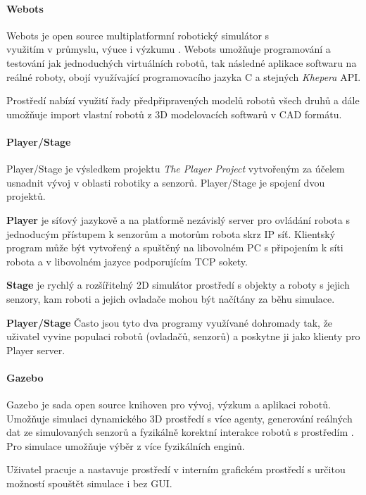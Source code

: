 \documentclass[a4paper, 12pt]{article}
\begin{document}
\paragraph{Webots}
Webots je open source multiplatformní robotický simulátor s \\využitím v
průmyslu, výuce i výzkumu \cite{Webots}. Webots umožňuje programování a
testování jak jednoduchých virtuálních robotů, tak následné aplikace softwaru na 
reálné roboty, obojí využívající programovacího jazyka C a stejných \emph{Khepera}
API\cite{michel1998webots}. 

Prostředí nabízí využití řady předpřipravených modelů robotů všech druhů 
a dále umožňuje import vlastní robotů z 3D modelovacích softwarů v CAD formátu.

\paragraph{Player/Stage}
Player/Stage je výsledkem projektu \emph{The Player Project}
\cite{playerproject} vytvořeným za účelem usnadnit vývoj v oblasti robotiky 
a senzorů. Player/Stage je spojení dvou projektů. 

\textbf{Player} je síťový jazykově a na platformě nezávislý 
server pro ovládání robota s jednoducým přístupem k senzorům a motorům robota
skrz IP síť. Klientský program může být vytvořený a spuštěný na libovolném PC s
připojením k síti robota a v libovolném jazyce podporujícím TCP sokety. 

\textbf{Stage} je rychlý a rozšířitelný 2D simulátor prostředí s objekty a roboty 
s jejich senzory, kam roboti a jejich ovladače mohou být načítány za běhu
simulace.

\textbf{Player/Stage} Často jsou tyto dva programy využívané dohromady tak, že
uživatel vyvine populaci robotů (ovladačů, senzorů) a poskytne ji jako klienty
pro Player server.

\paragraph{Gazebo}
Gazebo je sada open source knihoven pro vývoj, výzkum a aplikaci robotů. 
Umožňuje simulaci dynamického 3D prostředí s více agenty, generování reálných
dat ze simulovaných senzorů a fyzikálně korektní interakce robotů s
prostředím \cite{gazebo1389727}. Pro simulace umožňuje výběr z více fyzikálních
enginů. 

Uživatel pracuje a nastavuje prostředí v interním grafickém prostředí s určitou možností 
spouštět simulace i bez GUI.
\end{document}
